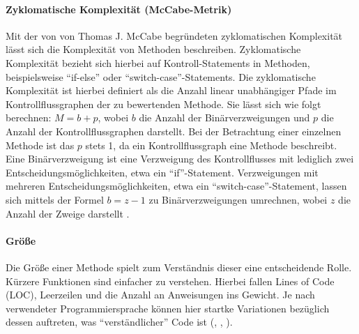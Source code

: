 \documentclass[a4paper, 12pt]{article}
\begin{document}
\paragraph{Zyklomatische Komplexität (McCabe-Metrik)}
Mit der von von Thomas J. McCabe begründeten zyklomatischen Komplexität lässt sich die Komplexität von Methoden beschreiben. 
Zyklomatische Komplexität bezieht sich hierbei auf Kontroll-Statements in Methoden, beispielsweise \enquote{if-else} oder \enquote{switch-case}-Statements.
Die zyklomatische Komplexität ist hierbei definiert als die Anzahl linear unabhängiger Pfade im Kontrollflussgraphen der zu bewertenden Methode. 
Sie lässt sich wie folgt berechnen: $M = b + p$, wobei $b$ die Anzahl der Binärverzweigungen und $p$ die Anzahl der Kontrollflussgraphen darstellt.
Bei der Betrachtung einer einzelnen Methode ist das $p$ stets 1, da ein Kontrollflussgraph eine Methode beschreibt.
Eine Binärverzweigung ist eine Verzweigung des Kontrollflusses mit lediglich zwei Entscheidungsmöglichkeiten, etwa ein \enquote{if}-Statement.
Verzweigungen mit mehreren Entscheidungsmöglichkeiten, etwa ein \enquote{switch-case}-Statement, lassen sich mittels der Formel $b = z - 1$ zu Binärverzweigungen umrechnen,  wobei $z$ die Anzahl der Zweige darstellt \parencite{McCabe_complexity}.

\paragraph{Größe}
Die Größe einer Methode spielt zum Verständnis dieser eine entscheidende Rolle. Kürzere Funktionen sind einfacher zu verstehen. 
Hierbei fallen Lines of Code (LOC), Leerzeilen und die Anzahl an Anweisungen ins Gewicht. 
Je nach verwendeter Programmiersprache können hier startke Variationen bezüglich dessen auftreten, was \enquote{verständlicher} Code ist (\textcite{Kim_software_implementation}, \textcite{Lorenz_object_oriented_software_metrics}, \textcite{Linda_softwarequality}).
\end{document}
